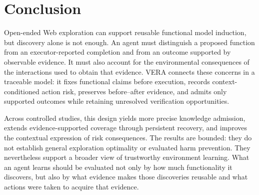 \section{Conclusion}
\label{sec:conclusion}

Open-ended Web exploration can support reusable functional model induction,
but discovery alone is not enough. An agent must distinguish a proposed
function from an executor-reported completion and from an outcome supported by
observable evidence. It must also account for the environmental consequences
of the interactions used to obtain that evidence. VERA connects these concerns
in a traceable model: it fixes functional claims before execution, records
context-conditioned action risk, preserves before--after evidence, and admits
only supported outcomes while retaining unresolved verification opportunities.

Across controlled studies, this design yields more precise knowledge admission,
extends evidence-supported coverage through persistent recovery, and improves
the contextual expression of risk consequences. The results are bounded: they
do not establish general exploration optimality or evaluated harm prevention.
They nevertheless support a broader view of trustworthy environment learning.
What an agent learns should be evaluated not only by how much functionality it
discovers, but also by what evidence makes those discoveries reusable and what
actions were taken to acquire that evidence.
